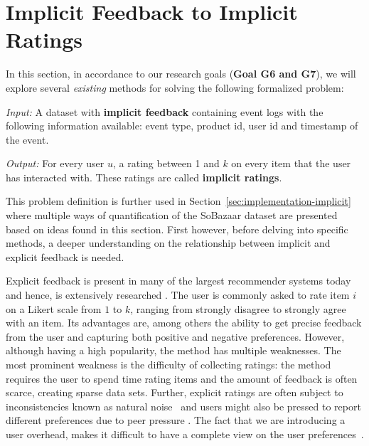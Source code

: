 
\clearpage

\section{Implicit Feedback to Implicit Ratings}
\label{sec:implicit}

In this section, in accordance to our research goals (\textbf{Goal G6 and G7}),
we will explore several \textit{existing} methods for solving the following
formalized problem:

\vspace{5 mm}

\noindent \textit{Input:} A dataset with \textbf{implicit feedback} containing event logs
with the following information available: event type, product id, user id and
timestamp of the event.

\vspace{3 mm}

\noindent \textit{Output:} For every user $u$, a rating between 1 and $k$ on every item that
the user has interacted with. These ratings are called \textbf{implicit
ratings}.

\vspace{5 mm}

This problem definition is further used in
Section~\ref{sec:implementation-implicit} where multiple ways of quantification
of the SoBazaar dataset are presented based on ideas found in this section.
First however, before delving into specific methods, a deeper understanding on
the relationship between implicit and explicit feedback is needed.

Explicit feedback is present in many of the largest recommender systems today
and hence, is extensively researched \cite{Adomavicius2005}. The user is
commonly asked to rate item $i$ on a Likert scale from $1$ to $k$, ranging from
strongly disagree to strongly agree with an item. Its advantages are, among
others the ability to get precise feedback from the user and capturing both
positive and negative preferences. However, although having a high popularity,
the method has multiple weaknesses. The most prominent weakness is the
difficulty of collecting ratings: the method requires the user to spend time
rating items and the amount of feedback is often scarce, creating sparse data
sets. Further, explicit ratings are often subject to inconsistencies known as
natural noise~\cite{amatriain2009like} and users might also be pressed to
report different preferences due to peer pressure \cite{bell2007scalable}. The
fact that we are introducing a user overhead, makes it difficult to have a
complete view on the user preferences~\cite{Jawaheer2010}.

